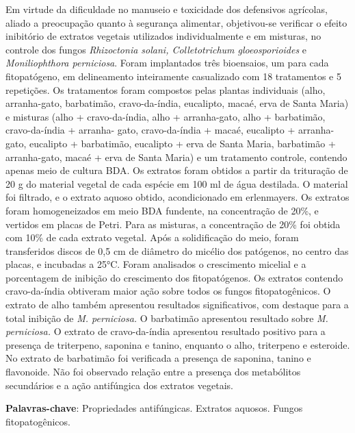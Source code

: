 \documentclass[article,12pt,onesidea,4paper,english,brazil]{abntex2}
\begin{document}
	\noindent Em virtude da dificuldade no manuseio e toxicidade dos defensivos agrícolas, aliado
	a preocupação quanto à segurança alimentar, objetivou-se verificar o efeito inibitório
	de extratos vegetais utilizados individualmente e em misturas, no controle dos
	fungos \textit{Rhizoctonia solani, Colletotrichum gloeosporioides} e \textit{Moniliophthora perniciosa}. Foram implantados três bioensaios, um para cada fitopatógeno, em
	delineamento inteiramente casualizado com 18 tratamentos e 5 repetições. Os
	tratamentos foram compostos pelas plantas individuais (alho, arranha-gato,
	barbatimão, cravo-da-índia, eucalipto, macaé, erva de Santa Maria) e misturas (alho
	+ cravo-da-índia, alho + arranha-gato, alho + barbatimão, cravo-da-índia + arranha-
	gato, cravo-da-índia + macaé, eucalipto + arranha-gato, eucalipto + barbatimão,
	eucalipto + erva de Santa Maria, barbatimão + arranha-gato, macaé + erva de Santa
	Maria) e um tratamento controle, contendo apenas meio de cultura BDA. Os extratos
	foram obtidos a partir da trituração de 20 g do material vegetal de cada espécie em
	100 ml de água destilada. O material foi filtrado, e o extrato aquoso obtido,
	acondicionado em erlenmayers. Os extratos foram homogeneizados em meio BDA
	fundente, na concentração de 20\%, e vertidos em placas de Petri. Para as misturas,
	a concentração de 20\% foi obtida com 10\% de cada extrato vegetal. Após a
	solidificação do meio, foram transferidos discos de 0,5 cm de diâmetro do micélio
	dos patógenos, no centro das placas, e incubadas a 25°C. Foram analisados o
	crescimento micelial e a porcentagem de inibição do crescimento dos fitopatógenos.
	Os extratos contendo cravo-da-índia obtiveram maior ação sobre todos os fungos
	fitopatogênicos. O extrato de alho também apresentou resultados significativos, com
	destaque para a total inibição de \textit{M. perniciosa.} O barbatimão apresentou resultado
	sobre \textit{M. perniciosa. }O extrato de cravo-da-índia apresentou resultado positivo para
	a presença de triterpeno, saponina e tanino, enquanto o alho, triterpeno e esteroide.
	No extrato de barbatimão foi verificada a presença de saponina, tanino e flavonoide.
	Não foi observado relação entre a presença dos metabólitos secundários e a ação
	antifúngica dos extratos vegetais.
	
	\vspace{\onelineskip}
	
	\noindent
	\textbf{Palavras-chave}: Propriedades antifúngicas. Extratos aquosos. Fungos
	fitopatogênicos.	
	
\end{document}
